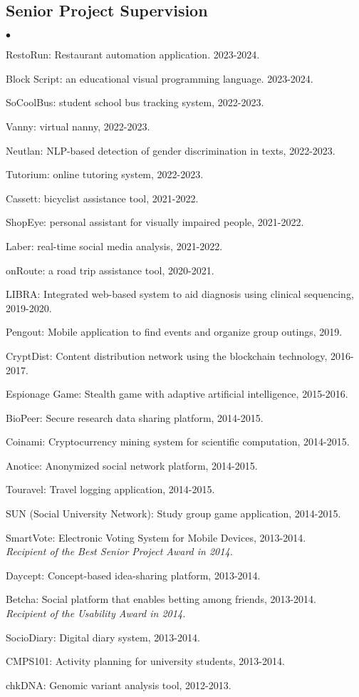 \documentclass[margin,line]{res}
\newenvironment{list2}{
  \begin{list}{$\bullet$}{%
      \setlength{\itemsep}{0.1cm}
      \setlength{\parsep}{0in} \setlength{\parskip}{0in}
      \setlength{\topsep}{0in} \setlength{\partopsep}{0in} 
      \setlength{\leftmargin}{0.2in}}}{\end{list}}
\begin{document}
\begin{resume}
\subsection{\small \sc Senior Project Supervision}
\begin{list2}
\item RestoRun: Restaurant automation application. 2023-2024.
\item Block Script: an educational visual programming language. 2023-2024.
\item SoCoolBus:  student school bus tracking system, 2022-2023.
\item Vanny: virtual nanny, 2022-2023.
\item Neutlan: NLP-based detection of gender discrimination in texts, 2022-2023.
\item Tutorium: online tutoring system, 2022-2023.
\item Cassett: bicyclist assistance tool, 2021-2022.
\item ShopEye: personal assistant for visually impaired people, 2021-2022.
\item Laber: real-time social media analysis, 2021-2022.
\item onRoute: a road trip assistance tool, 2020-2021.
\item LIBRA: Integrated web-based system to aid diagnosis using clinical sequencing, 2019-2020.
\item Pengout: Mobile application to find events and organize group outings, 2019.
  \item CryptDist: Content distribution network using the blockchain technology, 2016-2017.
\item Espionage Game: Stealth game with adaptive artificial intelligence, 2015-2016.
  \item BioPeer: Secure research data sharing platform, 2014-2015.
  \item Coinami: Cryptocurrency mining system for scientific computation, 2014-2015.
  \item Anotice: Anonymized social network platform, 2014-2015.
  \item Touravel: Travel logging application, 2014-2015. 
  \item SUN (Social University Network): Study group game application, 2014-2015.
  \item SmartVote: Electronic Voting System for Mobile Devices, 2013-2014. \\
    {\it Recipient of the Best Senior Project Award in 2014.}
  \item Daycept: Concept-based idea-sharing platform, 2013-2014.
  \item Betcha: Social platform that enables betting among friends, 2013-2014.\\
    {\it Recipient of the Usability Award in 2014.}
  \item SocioDiary: Digital diary system, 2013-2014.
  \item CMPS101: Activity planning for university students, 2013-2014.
  \item chkDNA: Genomic variant analysis tool, 2012-2013.
\end{list2}



\end{resume}
\end{document}
